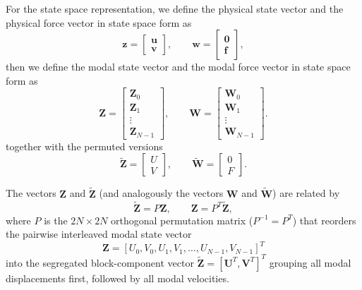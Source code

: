 \documentclass{Configuration_Files/PoliMi3i_thesis}
\newif\ifshowthesischanges
\DeclareRobustCommand{\thesischange}[2]{%
    \ifshowthesischanges
        \textcolor{#1}{#2}%
    \else
        #2%
    \fi
}
\def\thesischange#1#2{#2}%
\begin{document}
For the state space representation, we define the physical state vector and the physical force vector in state space form as
\begin{equation*}
\mathbf z
=
\begin{bmatrix}
\mathbf u\\
\mathbf v
\end{bmatrix},
\qquad
\mathbf w
=
\begin{bmatrix}
\mathbf 0\\
\mathbf f
\end{bmatrix},
\end{equation*}
then we define the modal state vector and the modal force vector in state space form as
\begin{equation*}
\mathbf Z
=
\begin{bmatrix}
\mathbf Z_0\\
\mathbf Z_1\\
\vdots\\
\mathbf Z_{N-1}
\end{bmatrix},
\qquad
\mathbf W
=
\begin{bmatrix}
\mathbf W_0\\
\mathbf W_1\\
\vdots\\
\mathbf W_{N-1}
\end{bmatrix}.
\end{equation*}
together with the permuted versions
\begin{equation*}
\widetilde{\mathbf Z}
=
\begin{bmatrix}
U\\
V
\end{bmatrix},
\qquad
\widetilde{\mathbf W}
=
\begin{bmatrix}
0\\
F
\end{bmatrix}.
\end{equation*}

The vectors $\mathbf Z$ and $\widetilde{\mathbf Z}$ (and analogously the vectors $\mathbf W$ and $\widetilde{\mathbf W}$) are related by
\begin{equation*}
\widetilde{\mathbf Z}
=
P\mathbf Z,
\qquad
\mathbf Z
=
P^T\widetilde{\mathbf Z},
\end{equation*}
\thesischange{blue}{where $P$ is the $2N\times2N$ orthogonal permutation matrix ($P^{-1} = P^T$) that reorders the pairwise interleaved modal state vector
\begin{equation*}
\mathbf Z = [U_0, V_0, U_1, V_1, \dots, U_{N-1}, V_{N-1}]^T
\end{equation*}
into the segregated block-component vector $\widetilde{\mathbf Z} = [\mathbf U^T, \mathbf V^T]^T$ grouping all modal displacements first, followed by all modal velocities.}
\end{document}
